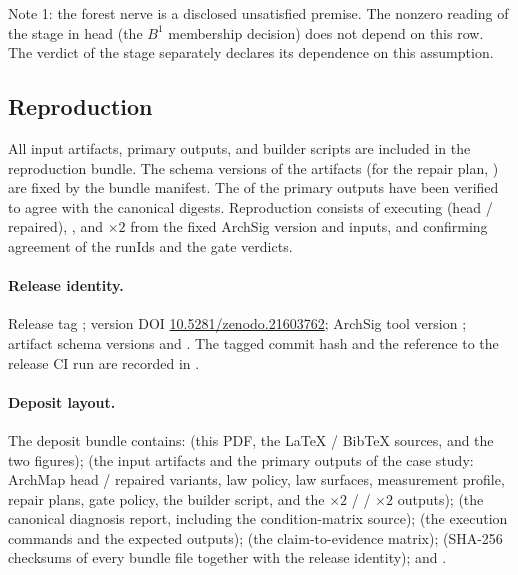 Note 1: the forest nerve is a disclosed unsatisfied premise. The
nonzero reading of the  stage in head (the $B^1$
membership decision) does not depend on this row. The verdict of the
 stage separately declares its dependence on this assumption.

\subsection{Reproduction}\label{app:C3}

All input artifacts, primary outputs, and builder scripts are included
in the reproduction bundle. The
schema versions of the artifacts (for the repair plan,
) are fixed by the bundle manifest.
The  of the primary outputs have been verified to
agree with the canonical digests. Reproduction consists of executing
 (head / repaired), , and 
$\times2$ from the fixed ArchSig version and inputs, and confirming
agreement of the runIds and the gate verdicts.

\paragraph{Release identity.}
Release tag ; version DOI
\href{https://doi.org/10.5281/zenodo.21603762}{10.5281/zenodo.21603762};
ArchSig tool version ; artifact schema versions
 and
. The tagged commit hash and the
reference to the release CI run are recorded in .

\paragraph{Deposit layout.}
The deposit bundle  contains:
 (this PDF, the \LaTeX{} / BibTeX sources, and the two
figures);  (the input artifacts and the primary
outputs of the case study: ArchMap head / repaired variants, law
policy, law surfaces, measurement profile, repair plans, gate policy,
the builder script, and the  $\times2$ / 
/  $\times2$ outputs);  (the canonical
diagnosis report, including the condition-matrix source);
 (the execution commands and the expected outputs);
 (the claim-to-evidence
matrix);  (SHA-256 checksums of every bundle file
together with the release identity); and .

